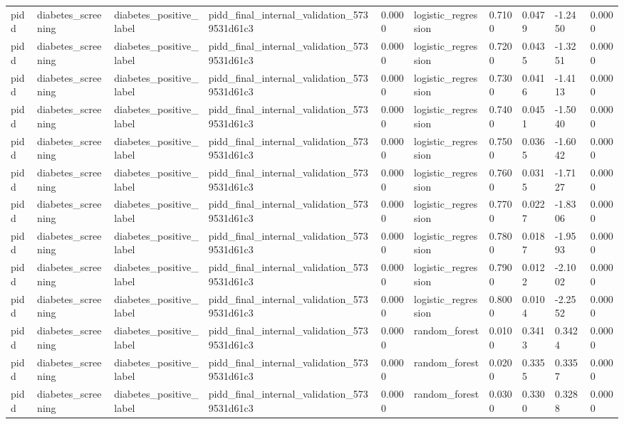 \begin{tabular}{llllllllll}
pidd & diabetes\_screening & diabetes\_positive\_label & pidd\_final\_internal\_validation\_5739531d61c3 & 0.0000 & logistic\_regression & 0.7100 & 0.0479 & -1.2450 & 0.0000 \\
pidd & diabetes\_screening & diabetes\_positive\_label & pidd\_final\_internal\_validation\_5739531d61c3 & 0.0000 & logistic\_regression & 0.7200 & 0.0435 & -1.3251 & 0.0000 \\
pidd & diabetes\_screening & diabetes\_positive\_label & pidd\_final\_internal\_validation\_5739531d61c3 & 0.0000 & logistic\_regression & 0.7300 & 0.0416 & -1.4113 & 0.0000 \\
pidd & diabetes\_screening & diabetes\_positive\_label & pidd\_final\_internal\_validation\_5739531d61c3 & 0.0000 & logistic\_regression & 0.7400 & 0.0451 & -1.5040 & 0.0000 \\
pidd & diabetes\_screening & diabetes\_positive\_label & pidd\_final\_internal\_validation\_5739531d61c3 & 0.0000 & logistic\_regression & 0.7500 & 0.0365 & -1.6042 & 0.0000 \\
pidd & diabetes\_screening & diabetes\_positive\_label & pidd\_final\_internal\_validation\_5739531d61c3 & 0.0000 & logistic\_regression & 0.7600 & 0.0315 & -1.7127 & 0.0000 \\
pidd & diabetes\_screening & diabetes\_positive\_label & pidd\_final\_internal\_validation\_5739531d61c3 & 0.0000 & logistic\_regression & 0.7700 & 0.0227 & -1.8306 & 0.0000 \\
pidd & diabetes\_screening & diabetes\_positive\_label & pidd\_final\_internal\_validation\_5739531d61c3 & 0.0000 & logistic\_regression & 0.7800 & 0.0187 & -1.9593 & 0.0000 \\
pidd & diabetes\_screening & diabetes\_positive\_label & pidd\_final\_internal\_validation\_5739531d61c3 & 0.0000 & logistic\_regression & 0.7900 & 0.0122 & -2.1002 & 0.0000 \\
pidd & diabetes\_screening & diabetes\_positive\_label & pidd\_final\_internal\_validation\_5739531d61c3 & 0.0000 & logistic\_regression & 0.8000 & 0.0104 & -2.2552 & 0.0000 \\
pidd & diabetes\_screening & diabetes\_positive\_label & pidd\_final\_internal\_validation\_5739531d61c3 & 0.0000 & random\_forest & 0.0100 & 0.3413 & 0.3424 & 0.0000 \\
pidd & diabetes\_screening & diabetes\_positive\_label & pidd\_final\_internal\_validation\_5739531d61c3 & 0.0000 & random\_forest & 0.0200 & 0.3355 & 0.3357 & 0.0000 \\
pidd & diabetes\_screening & diabetes\_positive\_label & pidd\_final\_internal\_validation\_5739531d61c3 & 0.0000 & random\_forest & 0.0300 & 0.3300 & 0.3288 & 0.0000 \\

\end{tabular}
